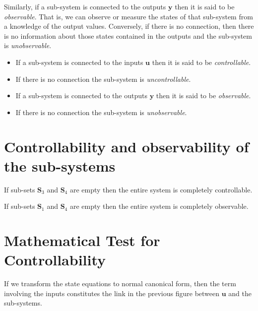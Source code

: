 Similarly, if a sub-system is connected to the outputs $\mathbf{y}$ then it is said to be \emph{observable}. That is, we can observe or measure the states of that sub-system from a knowledge of the output values. Conversely, if there is no connection, then there is no information about those states contained in the outputs and the sub-system is \emph{unobservable}.
\ifslidesonly
\begin{slide}
\begin{itemize}
	\item If a sub-system is connected to the inputs $\mathbf{u}$ then it is said to be \emph{controllable}. 
	\item If there is no connection the sub-system is \emph{uncontrollable}.
	\item If a sub-system is connected to the outputs $\mathbf{y}$ then it is said to be \emph{observable}. 
	\item If there is no connection the sub-system is \emph{unobservable}.
\end{itemize}
\end{slide}
\fi
 

\section*{Controllability and observability of the sub-systems} %
\label{sec:section_name}


\ifslidesonly
\begin{slide}
   
\end{slide}
\fi


If sub-sets $\mathbf{S}_3$ and $\mathbf{S}_4$ are empty then the entire system is completely controllable.

If sub-sets $\mathbf{S}_1$ and $\mathbf{S}_4$ are empty then the entire system is completely observable.



\section*{Mathematical Test for Controllability} %
\label{sec:mathematical_test_for_controllability}


If we transform the state equations to normal canonical form, then the term involving the inputs constitutes the link in the previous figure between $\mathbf{u}$ and the sub-systems.

